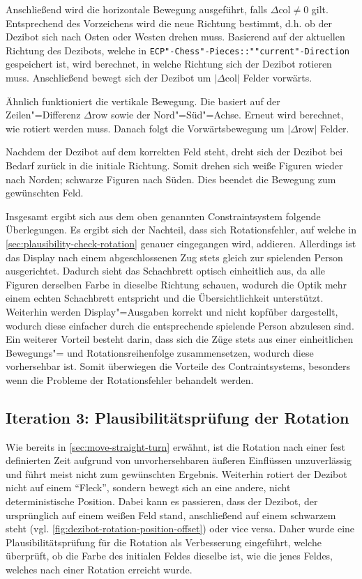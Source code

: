 Anschließend wird die horizontale Bewegung ausgeführt, falls $\Delta\text{col} \ne 0$ gilt. Entsprechend des Vorzeichens wird die neue Richtung bestimmt, d.h. ob der Dezibot sich nach Osten oder Westen drehen muss. Basierend auf der aktuellen Richtung des Dezibots, welche in \texttt{ECP"-Chess"-Pieces::""current"-Direction} gespeichert ist, wird berechnet, in welche Richtung sich der Dezibot rotieren muss. Anschließend bewegt sich der Dezibot um $\vert \Delta\text{col} \vert$ Felder vorwärts.

Ähnlich funktioniert die vertikale Bewegung. Die basiert auf der Zeilen"=Differenz $\Delta\text{row}$ sowie der Nord"=Süd"=Achse. Erneut wird berechnet, wie rotiert werden muss. Danach folgt die Vorwärtsbewegung um $\vert \Delta\text{row} \vert$ Felder.

Nachdem der Dezibot auf dem korrekten Feld steht, dreht sich der Dezibot bei Bedarf zurück in die initiale Richtung. Somit drehen sich weiße Figuren wieder nach Norden; schwarze Figuren nach Süden. Dies beendet die Bewegung zum gewünschten Feld.


Insgesamt ergibt sich aus dem oben genannten Constraintsystem folgende Überlegungen. Es ergibt sich der Nachteil, dass sich Rotationsfehler, auf welche in \autoref{sec:plausibility-check-rotation} genauer eingegangen wird, addieren. Allerdings ist das Display nach einem abgeschlossenen Zug stets gleich zur spielenden Person ausgerichtet. Dadurch sieht das Schachbrett optisch einheitlich aus, da alle Figuren derselben Farbe in dieselbe Richtung schauen, wodurch die Optik mehr einem echten Schachbrett entspricht und die Übersichtlichkeit unterstützt. Weiterhin werden Display"=Ausgaben korrekt und nicht kopfüber dargestellt, wodurch diese einfacher durch die entsprechende spielende Person abzulesen sind. Ein weiterer Vorteil besteht darin, dass sich die Züge stets aus einer einheitlichen Bewegungs"= und Rotationsreihenfolge zusammensetzen, wodurch diese vorhersehbar ist. Somit überwiegen die Vorteile des Contraintsystems, besonders wenn die Probleme der Rotationsfehler behandelt werden.


\subsection{Iteration 3: Plausibilitätsprüfung der Rotation}
\label{sec:plausibility-check-rotation}

Wie bereits in \autoref{sec:move-straight-turn} erwähnt, ist die Rotation nach einer fest definierten Zeit aufgrund von unvorhersehbaren äußeren Einflüssen unzuverlässig und führt meist nicht zum gewünschten Ergebnis. Weiterhin rotiert der Dezibot nicht auf einem \enquote{Fleck}, sondern bewegt sich an eine andere, nicht deterministische Position. Dabei kann es passieren, dass der Dezibot, der ursprünglich auf einem weißen Feld stand, anschließend auf einem schwarzem steht (vgl. \autoref{fig:dezibot-rotation-position-offset}) oder vice versa. Daher wurde eine Plausibilitätsprüfung für die Rotation als Verbesserung eingeführt, welche überprüft, ob die Farbe des initialen Feldes dieselbe ist, wie die jenes Feldes, welches nach einer Rotation erreicht wurde.

